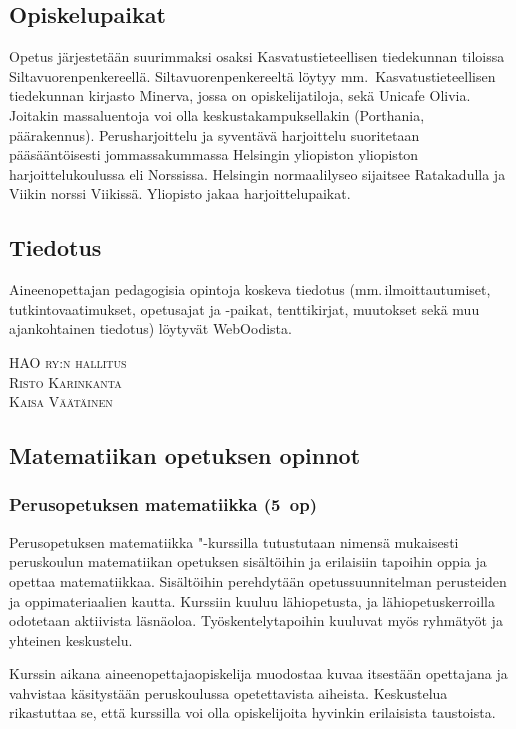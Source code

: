 \documentclass[../ala_hataile.tex]{subfiles}
\begin{document}
\subsection*{Opiskelupaikat}
Opetus järjestetään suurimmaksi osaksi
Kasvatus\-tieteellisen tiedekunnan tiloissa Silta\-vuoren\-penkereellä. Silta\-vuoren\-penkereeltä löytyy mm.\, Kasvatus\-tieteellisen
tiede\-kunnan kirjasto Minerva,
jossa on opiskelija\-tiloja, sekä Unicafe Olivia. Joitakin massaluentoja voi
olla keskusta\-kampuksellakin (Porthania, päärakennus).
Perus\-harjoittelu ja syventävä harjoittelu
suoritetaan pää\-sääntöisesti jommassa\-kummassa Helsingin yliopiston yliopiston
harjoittelu\-koulussa eli Norssissa.
Helsingin normaali\-lyseo sijaitsee Ratakadulla
ja Viikin norssi Viikissä. Yliopisto jakaa harjoittelu\-paikat.
\subsection*{Tiedotus}
Aineen\-opettajan pe\-da\-go\-gi\-si\-a opintoja
koskeva tiedotus (mm.\,ilmoit\-tautumiset,
tutkinto\-vaatimukset, opetus\-ajat ja -paikat,
tenttikirjat, muutokset sekä muu ajankohtainen
tiedotus) löytyvät WebOodista.

\vspace{0.5cm}\noindent
\textsc{HAO ry:n hallitus}\\
\textsc{Risto Karinkanta}\\
\textsc{Kaisa Väätäinen}

\subsection*{Matematiikan opetuksen opinnot}
\subsubsection*{Perusopetuksen matematiikka (5~op)}
Perusopetuksen matematiikka "-kurssilla tutustutaan nimensä mukaisesti peruskoulun matematiikan opetuksen sisältöihin ja erilaisiin tapoihin oppia ja opettaa matematiikkaa. Sisältöihin perehdytään opetussuunnitelman perusteiden ja oppimateriaalien kautta. Kurssiin kuuluu lähiopetusta, ja lähiopetuskerroilla odotetaan aktiivista läsnäoloa. Työskentelytapoihin kuuluvat myös ryhmätyöt ja yhteinen keskustelu. 

Kurssin aikana aineenopettajaopiskelija muodostaa kuvaa itsestään opettajana ja vahvistaa käsitystään peruskoulussa opetettavista aiheista. Keskustelua rikastuttaa se, että kurssilla voi olla opiskelijoita hyvinkin erilaisista taustoista.
\end{document}
